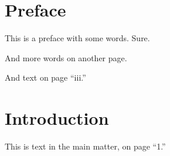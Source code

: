 \documentclass{stml-l}
\begin{document}
\frontmatter
\chapter*{Preface}
This is a preface with some words. Sure.

\newpage

And more words on another page.

\newpage

And text on page ``iii.''

\mainmatter

\chapter{Introduction}
This is text in the main matter, on page ``1.''
\end{document}
